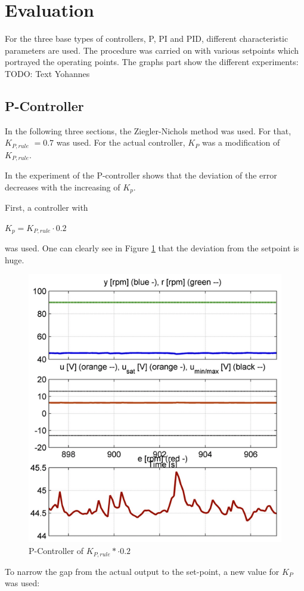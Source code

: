 \section{Evaluation}

For the three base types of controllers, P, PI and PID, different characteristic parameters are used. The procedure was carried on with various setpoints which portrayed the operating points. The graphs part show the different experiments:
TODO: Text Yohannes

\subsection{P-Controller}
In the following three sections, the Ziegler-Nichols method was used. For that, \textbf{$K_{P,rule}$} $= 0.7$ was used. For the actual controller, $K_P$ was a modification of $K_{P,rule}$.


In the experiment of the P-controller shows that the deviation of the error decreases with the increasing of $K_{p}$.

First, a controller with
\begin{center}
{$K_{p}= K_{P,rule}\cdot{0.2}$}
\end{center}

was used. One can clearly see in Figure \ref{fig:p_controller2} that the deviation from the setpoint is huge.

\begin{figure}[H]
\begin{center}
\includegraphics[width=0.5\linewidth]{images/general/P/p_controller02}
\end{center}
\caption{P-Controller of $ K_{P,rule}*\cdot{0.2}$}
\label{fig:p_controller2}
\end{figure}

To narrow the gap from the actual output to the set-point, a new value for $K_P$ was used:

